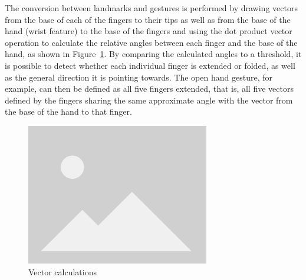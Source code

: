 The conversion between landmarks and gestures is performed by drawing vectors from the base of each of the fingers to their tips as well as from the base of the hand (wrist feature) to the base of the fingers and using the dot product vector operation to calculate the relative angles between each finger and the base of the hand, as shown in Figure~\ref{fig:vector-calcs}.
By comparing the calculated angles to a threshold, it is possible to detect whether each individual finger is extended or folded, as well as the general direction it is pointing towards.
The open hand gesture, for example, can then be defined as all five fingers extended, that is, all five vectors defined by the fingers sharing the same approximate angle with the vector from the base of the hand to that finger.

\begin{figure}
  \centering
  \includegraphics[width=8cm, keepaspectratio]{img/placeholder.png}
  \caption{Vector calculations}\label{fig:vector-calcs}
\end{figure}

